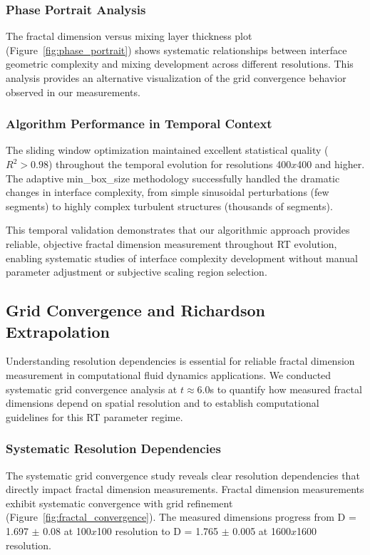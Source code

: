 \documentclass[preprint,12pt]{elsarticle}
\def\times{x}%
\begin{document}
\subsubsection{Phase Portrait Analysis}

The fractal dimension versus mixing layer thickness plot (Figure~\ref{fig:phase_portrait}) shows systematic relationships between interface geometric complexity and mixing development across different resolutions. This analysis provides an alternative visualization of the grid convergence behavior observed in our measurements.

\subsubsection{Algorithm Performance in Temporal Context}

The sliding window optimization maintained excellent statistical quality ($R^2 > 0.98$) throughout the temporal evolution for resolutions 400$\times$400 and higher. The adaptive min\_box\_size methodology successfully handled the dramatic changes in interface complexity, from simple sinusoidal perturbations (few segments) to highly complex turbulent structures (thousands of segments).

This temporal validation demonstrates that our algorithmic approach provides reliable, objective fractal dimension measurement throughout RT evolution, enabling systematic studies of interface complexity development without manual parameter adjustment or subjective scaling region selection.

\subsection{Grid Convergence and Richardson Extrapolation}
\label{subsec:grid_convergence}

Understanding resolution dependencies is essential for reliable fractal dimension measurement in computational fluid dynamics applications. We conducted systematic grid convergence analysis at $t \approx 6.0$s to quantify how measured fractal dimensions depend on spatial resolution and to establish computational guidelines for this RT parameter regime.

\subsubsection{Systematic Resolution Dependencies}

The systematic grid convergence study reveals clear resolution dependencies that directly impact fractal dimension measurements. Fractal dimension measurements exhibit systematic convergence with grid refinement (Figure~\ref{fig:fractal_convergence}). The measured dimensions progress from D = 1.697 $\pm$ 0.08 at 100$\times$100 resolution to D = 1.765 $\pm$ 0.005 at 1600$\times$1600 resolution.
\end{document}

